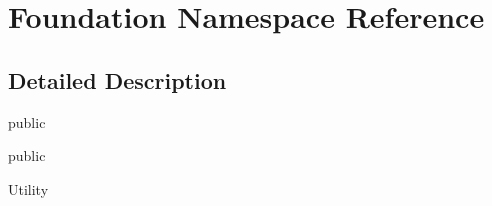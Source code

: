 \hypertarget{namespace_foundation}{}\section{Foundation Namespace Reference}
\label{namespace_foundation}


\subsection{Detailed Description}
public

public

Utility 